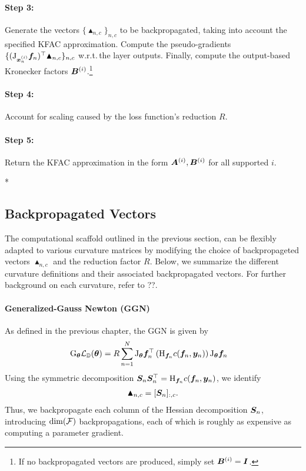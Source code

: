 \paragraph{Step 3:} Generate the vectors $\{\blacktriangle_{n,c}\}_{n,c}$ to be backpropagated, taking into account the specified KFAC approximation. Compute the pseudo-gradients $\{(\mathrm{J}_{{\bm{x}}_n^{(i)}} {\bm{f}}_n)^{\top} \blacktriangle_{n,c} \}_{n,c}$ w.r.t.\,the layer outputs. Finally, compute the output-based Kronecker factors ${\bm{B}}^{(i)}$.\footnote{If no backpropagated vectors are produced, simply set ${\bm{B}}^{(i)} = {\bm{I}}$.}

\paragraph{Step 4:} Account for scaling caused by the loss function's reduction $R$.

\paragraph{Step 5:} Return the KFAC approximation in the form ${\bm{A}}^{(i)}, {\bm{B}}^{(i)}$ for all supported $i$.

\switchcolumn[1]*
\switchcolumn[0]

\subsection{Backpropagated Vectors}
The computational scaffold outlined in the previous section, can be flexibly adapted to various curvature matrices by modifying the choice of backpropageted vectors $\blacktriangle_{n,c}$ and the reduction factor $R$. Below, we summarize the different curvature definitions and their associated backpropagated vectors. For further background on each curvature, refer to ??.

\paragraph{Generalized-Gauss Newton (GGN)}
As defined in the previous chapter, the GGN is given by\begin{align*}
\mathrm{G}_{{\bm{\theta}}}{\mathcal{L}}_{{\mathbb{D}}}({\bm{\theta}})
&= R \sum_{n=1}^N
  \mathrm{J}_{{\bm{\theta}}} {\bm{f}}_n^{\top}
  \left(
  \mathrm{H}_{{\bm{f}}_n} c({\bm{f}}_n, {\bm{y}}_n)
  \right)
  \mathrm{J}_{{\bm{\theta}}} {\bm{f}}_n
\end{align*}
Using the symmetric decomposition ${\bm{S}}_n {\bm{S}}_n^{\top} = \mathrm{H}_{{\bm{f}}_n} c({\bm{f}}_n, {\bm{y}}_n)$, we identify 
\begin{align*}
  \blacktriangle_{n,c} = [{\bm{S}}_n]_{:,c}.
\end{align*}
Thus, we backpropagate each column of the Hessian decomposition ${\bm{S}}_n$, introducing $\dim({\mathcal{F}})$ backpropagations, each of which is roughly as expensive as computing a parameter gradient.


